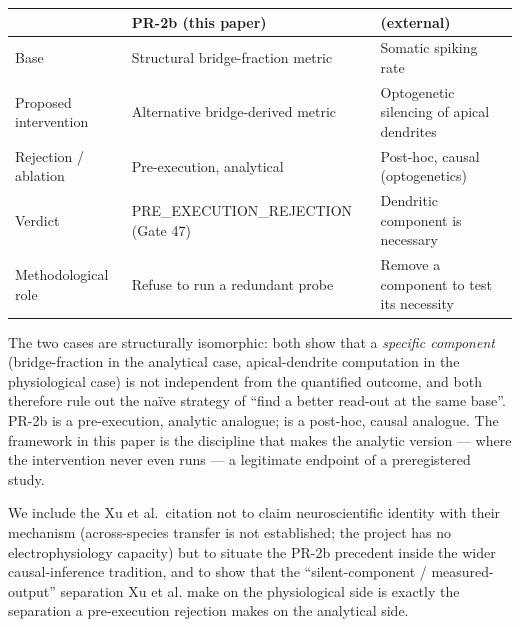 \documentclass[
]{article}
\newcounter{none} %
\begin{document}
{\def\LTcaptype{none} %
\begin{longtable}[]{@{}
  >{\raggedright\arraybackslash}p{}
  >{\raggedright\arraybackslash}p{}
  >{\raggedright\arraybackslash}p{}@{}}
\toprule\noalign{}
\begin{minipage}[b]{\linewidth}\raggedright
\end{minipage} & \begin{minipage}[b]{\linewidth}\raggedright
PR-2b (this paper)
\end{minipage} & \begin{minipage}[b]{\linewidth}\raggedright
\citet{ref07} (external)
\end{minipage} \\
\midrule\noalign{}
\endhead
\bottomrule\noalign{}
\endlastfoot
Base & Structural bridge-fraction metric & Somatic spiking rate \\
Proposed intervention & Alternative bridge-derived metric & Optogenetic
silencing of apical dendrites \\
Rejection / ablation & Pre-execution, analytical & Post-hoc, causal
(optogenetics) \\
Verdict & PRE\_EXECUTION\_REJECTION (Gate 47) & Dendritic component is
necessary \\
Methodological role & Refuse to run a redundant probe & Remove a
component to test its necessity \\
\end{longtable}
}

The two cases are structurally isomorphic: both show that a
\emph{specific component} (bridge-fraction in the analytical case,
apical-dendrite computation in the physiological case) is not
independent from the quantified outcome, and both therefore rule out the
naïve strategy of ``find a better read-out at the same base''. PR-2b is
a pre-execution, analytic analogue; \citet{ref07} is a post-hoc, causal
analogue. The framework in this paper is the discipline that makes the
analytic version --- where the intervention never even runs --- a
legitimate endpoint of a preregistered study.

We include the Xu et al.~citation not to claim neuroscientific identity
with their mechanism (across-species transfer is not established; the
project has no electrophysiology capacity) but to situate the PR-2b
precedent inside the wider causal-inference tradition, and to show that
the ``silent-component / measured-output'' separation Xu et al. make on
the physiological side is exactly the separation a pre-execution
rejection makes on the analytical side.
\end{document}
